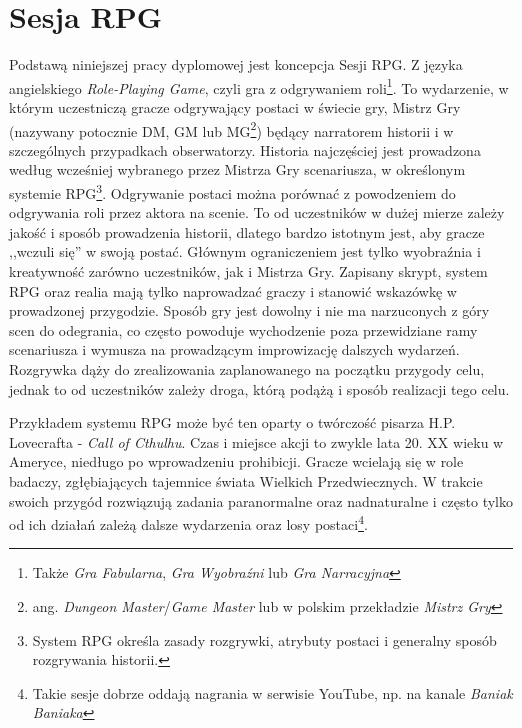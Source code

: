 \documentclass[shortabstract,inz]{iithesis}
\begin{document}
		\section{Sesja RPG}
			Podstawą niniejszej pracy dyplomowej jest koncepcja Sesji RPG. Z języka angielskiego \textit{Role-Playing Game}, czyli gra z odgrywaniem roli\footnote{Także \textit{Gra Fabularna}, \textit{Gra Wyobraźni} lub \textit{Gra Narracyjna}}. To wydarzenie, w którym uczestniczą gracze odgrywający postaci w świecie gry, Mistrz Gry (nazywany potocznie DM, GM lub MG\footnote{ang. \textit{Dungeon Master}/\textit{Game Master} lub w polskim przekładzie \textit{Mistrz Gry}}) będący narratorem historii i w szczególnych przypadkach obserwatorzy. Historia najczęściej jest prowadzona według wcześniej wybranego przez Mistrza Gry scenariusza, w określonym systemie RPG\footnote{System RPG określa zasady rozgrywki, atrybuty postaci i generalny sposób rozgrywania historii.}. Odgrywanie postaci można porównać z powodzeniem do odgrywania roli przez aktora na scenie. To od uczestników w dużej mierze zależy jakość i sposób prowadzenia historii, dlatego bardzo istotnym jest, aby gracze ,,wczuli się'' w swoją postać. Głównym ograniczeniem jest tylko wyobraźnia i kreatywność zarówno uczestników, jak i Mistrza Gry. Zapisany skrypt, system RPG oraz realia mają tylko naprowadzać graczy i stanowić wskazówkę w prowadzonej przygodzie. Sposób gry jest dowolny i nie ma narzuconych z góry scen do odegrania, co często powoduje wychodzenie poza przewidziane ramy scenariusza i wymusza na prowadzącym improwizację dalszych wydarzeń. Rozgrywka dąży do zrealizowania zaplanowanego na początku przygody celu, jednak to od uczestników zależy droga, którą podążą i sposób realizacji tego celu. 
			
			Przykładem systemu RPG może być ten oparty o twórczość pisarza H.P. Lovecrafta - \textit{Call of Cthulhu}. Czas i miejsce akcji to zwykle lata 20. XX wieku w Ameryce, niedługo po wprowadzeniu prohibicji. Gracze wcielają się w role badaczy, zgłębiających tajemnice świata Wielkich Przedwiecznych. W trakcie swoich przygód rozwiązują zadania paranormalne oraz nadnaturalne i często tylko od ich działań zależą dalsze wydarzenia oraz losy postaci\footnote{Takie sesje dobrze oddają nagrania w serwisie YouTube, np. na kanale \textit{Baniak Baniaka}\cite{baniakbaniaka}}.
			
\end{document}
